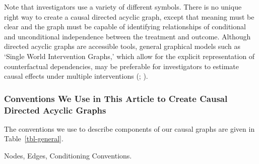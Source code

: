\documentclass[
  single column]{article}
\begin{document}
Note that investigators use a variety of different symbols. There is no
unique right way to create a causal directed acyclic graph, except that
meaning must be clear and the graph must be capable of identifying
relationships of conditional and unconditional independence between the
treatment and outcome. Although directed acyclic graphs are accessible
tools, general graphical models such as `Single World Intervention
Graphs,' which allow for the explicit representation of counterfactual
dependencies, may be preferable for investigators to estimate causal
effects under multiple interventions
(;
).

\subsubsection{Conventions We Use in This Article to Create Causal
Directed Acyclic
Graphs}\label{conventions-we-use-in-this-article-to-create-causal-directed-acyclic-graphs}

The conventions we use to describe components of our causal graphs are
given in Table~\ref{tbl-general}.

\begin{table}

\caption{\label{tbl-general}Nodes, Edges, Conditioning Conventions.}

\centering{

\terminologygeneraldags

}

\end{table}%
\end{document}

